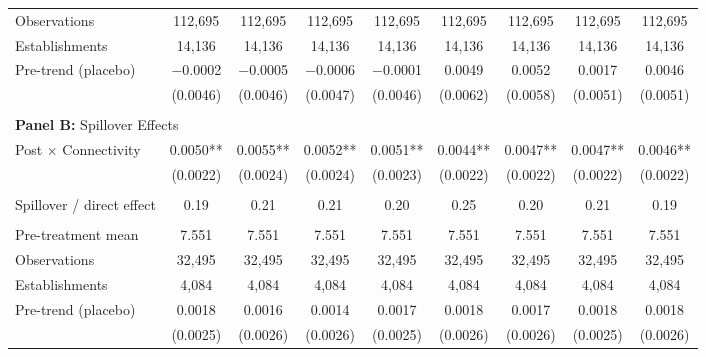 \begin{table}[H]
\begin{tabular}{lcccccccc}
Observations & 112{,}695 & 112{,}695 & 112{,}695 & 112{,}695 & 112{,}695 & 112{,}695 & 112{,}695 & 112{,}695\\
Establishments & 14{,}136 & 14{,}136 & 14{,}136 & 14{,}136 & 14{,}136 & 14{,}136 & 14{,}136 & 14{,}136\\
\midrule
Pre-trend (placebo) & $-$0.0002 & $-$0.0005 & $-$0.0006 & $-$0.0001 & 0.0049 & 0.0052 & 0.0017 & 0.0046\\
  & (0.0046) & (0.0046) & (0.0047) & (0.0046) & (0.0062) & (0.0058) & (0.0051) & (0.0051)\\
 &  &  &  &  &  &  &  & \\
 \midrule
\multicolumn{9}{l}{\textbf{Panel B:} Spillover Effects} \\
Post $\times$ Connectivity & 0.0050** & 0.0055** & 0.0052** & 0.0051** & 0.0044** & 0.0047** & 0.0047** & 0.0046**\\
  & (0.0022) & (0.0024) & (0.0024) & (0.0023) & (0.0022) & (0.0022) & (0.0022) & (0.0022)\\
 &  &  &  &  &  &  &  & \\
Spillover / direct effect & 0.19 & 0.21 & 0.21 & 0.20 & 0.25 & 0.20 & 0.21 & 0.19\\
 &  &  &  &  &  &  &  & \\
Pre-treatment mean & 7.551 & 7.551 & 7.551 & 7.551 & 7.551 & 7.551 & 7.551 & 7.551\\
Observations & 32{,}495 & 32{,}495 & 32{,}495 & 32{,}495 & 32{,}495 & 32{,}495 & 32{,}495 & 32{,}495\\
Establishments & 4{,}084 & 4{,}084 & 4{,}084 & 4{,}084 & 4{,}084 & 4{,}084 & 4{,}084 & 4{,}084\\
\midrule
Pre-trend (placebo) & 0.0018 & 0.0016 & 0.0014 & 0.0017 & 0.0018 & 0.0017 & 0.0018 & 0.0018\\
  & (0.0025) & (0.0026) & (0.0026) & (0.0025) & (0.0026) & (0.0026) & (0.0025) & (0.0026)\\
\bottomrule\bottomrule
\end{tabular}
\begin{minipage}{\linewidth}
    \scriptsize\vspace{4pt}

\end{minipage}
\end{table}
